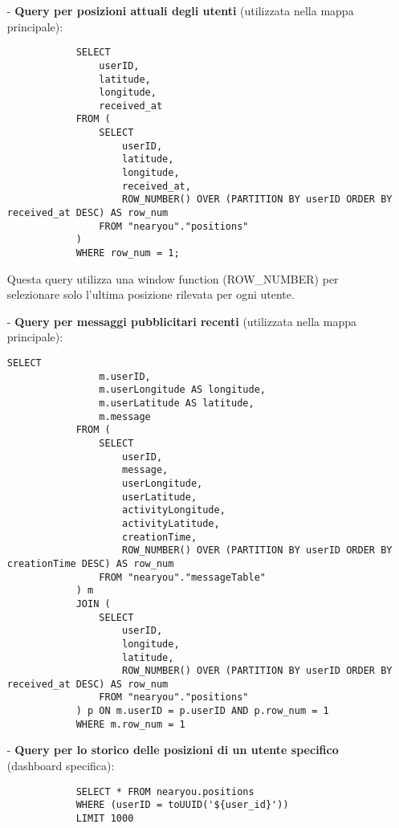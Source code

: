 \documentclass[10pt]{article}
\begin{document}
        \begin{itemize}
            \item[-] \textbf{Query per posizioni attuali degli utenti} (utilizzata nella mappa principale):
            \begin{lstlisting}
            SELECT 
                userID, 
                latitude, 
                longitude, 
                received_at
            FROM (
                SELECT 
                    userID, 
                    latitude, 
                    longitude, 
                    received_at,
                    ROW_NUMBER() OVER (PARTITION BY userID ORDER BY received_at DESC) AS row_num
                FROM "nearyou"."positions"
            ) 
            WHERE row_num = 1;
            \end{lstlisting}
            Questa query utilizza una window function (ROW\_NUMBER) per selezionare solo l'ultima posizione rilevata per ogni utente.
        
            \item[-] \textbf{Query per messaggi pubblicitari recenti} (utilizzata nella mappa principale):
            \begin{lstlisting}[basicstyle=\ttfamily\footnotesize]
            SELECT 
                m.userID, 
                m.userLongitude AS longitude, 
                m.userLatitude AS latitude, 
                m.message
            FROM (
                SELECT 
                    userID, 
                    message,
                    userLongitude,
                    userLatitude,
                    activityLongitude,
                    activityLatitude,
                    creationTime,
                    ROW_NUMBER() OVER (PARTITION BY userID ORDER BY creationTime DESC) AS row_num
                FROM "nearyou"."messageTable"
            ) m
            JOIN (
                SELECT 
                    userID, 
                    longitude, 
                    latitude,
                    ROW_NUMBER() OVER (PARTITION BY userID ORDER BY received_at DESC) AS row_num
                FROM "nearyou"."positions"
            ) p ON m.userID = p.userID AND p.row_num = 1
            WHERE m.row_num = 1
            \end{lstlisting}
        
            \item[-] \textbf{Query per lo storico delle posizioni di un utente specifico} (dashboard specifica):
            \begin{lstlisting}
            SELECT * FROM nearyou.positions 
            WHERE (userID = toUUID('${user_id}')) 
            LIMIT 1000
            \end{lstlisting}
        

\end{itemize}
\end{document}
